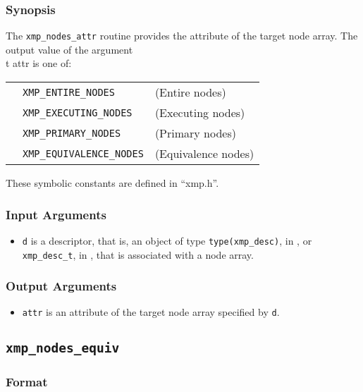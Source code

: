 \subsubsection*{Synopsis}

The {\tt xmp\_nodes\_attr} routine provides the attribute of the target
node array. The output value of the argument {\\t attr} is one of:

\begin{tabular}{lll}
  \hspace{2.5cm} & {\tt XMP\_ENTIRE\_NODES} & (Entire nodes)\\
                 & {\tt XMP\_EXECUTING\_NODES}  & (Executing nodes) \\
                 & {\tt XMP\_PRIMARY\_NODES} & (Primary nodes) \\
                 & {\tt XMP\_EQUIVALENCE\_NODES} & (Equivalence nodes) \\
\end{tabular}

These symbolic constants are defined in ``xmp.h''.

\subsubsection*{Input Arguments}
\begin{itemize}
 \item {\tt d} is a descriptor, that is, an object of type 
       {\tt type(xmp\_desc)}, in {\XMPF}, or {\tt xmp\_desc\_t},
       in {\XMPC}, that is associated with a node array.
\end{itemize}

\subsubsection*{Output Arguments}
\begin{itemize}
 \item {\tt attr} is an attribute of the target node array specified by
       {\tt d}.
\end{itemize}


\subsection{\tt xmp\_nodes\_equiv}

\subsubsection*{Format}

